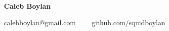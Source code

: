 \begin{center}
    {\LARGE \textbf{Caleb Boylan}}

    \vspace{5px}

    calebboylan@gmail.com \ \ \textbullet \ \ github.com/squidboylan
\end{center}
